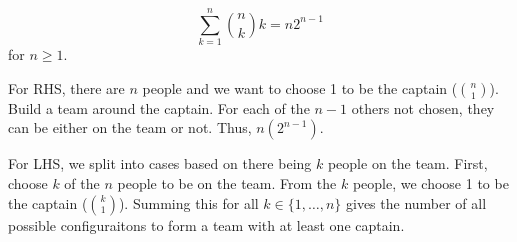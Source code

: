 \begin{example}
    $$
    \sum_{k=1}^n \binom{n}{k} k = n 2^{n-1}
    $$
    for $n \geq 1$.

    For RHS, there are $n$ people and we want to choose 1 to be the captain ($\binom{n}{1}$). Build a team around the captain. For each of the $n-1$ others not chosen, they can be either on the team or not. Thus, $n (2^{n-1})$.

    For LHS, we split into cases based on there being $k$ people on the team. First, choose $k$ of the $n$ people to be on the team. From the $k$ people, we choose 1 to be the captain ($\binom{k}{1}$). Summing this for all $k \in \{1,\ldots,n\}$ gives the number of all possible configuraitons to form a team with at least one captain.
\end{example}

